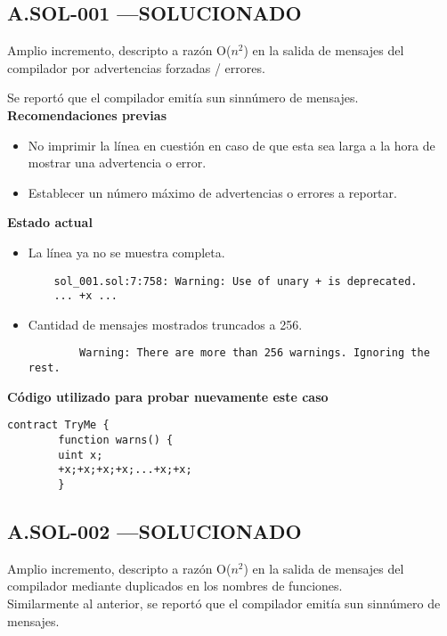 \subsection*{A.SOL-001 \color{ForestGreen}—SOLUCIONADO}
Amplio incremento, descripto a razón O(${n^2}$) en la salida de mensajes del compilador por advertencias forzadas / errores.
\bigskip

Se reportó que el compilador emitía sun sinnúmero de mensajes.\\

\textbf{Recomendaciones previas}
\begin{itemize}
    \item No imprimir la línea en cuestión en caso de que esta sea larga a la hora de mostrar una advertencia o error.
    \item Establecer un número máximo de advertencias o errores a reportar.
\end{itemize}
\bigskip

\textbf{Estado actual}
\begin{itemize}
    \item La línea ya no se muestra completa.
    \begin{lstlisting}
    sol_001.sol:7:758: Warning: Use of unary + is deprecated.
    ... +x ...
    \end{lstlisting}
    \item Cantidad de mensajes mostrados truncados a 256.
    \begin{lstlisting}
        Warning: There are more than 256 warnings. Ignoring the rest.
    \end{lstlisting}
\end{itemize}
\bigskip

\textbf{Código utilizado para probar nuevamente este caso}
\begin{lstlisting}[language=Solidity]
    contract TryMe {
        function warns() {
        uint x;
        +x;+x;+x;+x;...+x;+x;
        }        
\end{lstlisting}


\subsection*{A.SOL-002  \color{ForestGreen}—SOLUCIONADO}
Amplio incremento, descripto a razón O(${n^2}$) en la salida de mensajes del compilador mediante duplicados en los nombres de funciones.\\

Similarmente al anterior, se reportó que el compilador emitía sun sinnúmero de mensajes.\\

